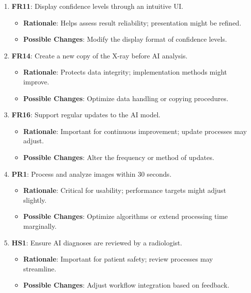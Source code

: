 \documentclass[12pt]{article}
\begin{document}
\begin{enumerate}[resume]
    \item \textbf{FR11}: Display confidence levels through an intuitive UI.
    \begin{itemize}[label=-]
        \item \textbf{Rationale}: Helps assess result reliability; presentation might be refined.
        \item \textbf{Possible Changes}: Modify the display format of confidence levels.
    \end{itemize}

    \item \textbf{FR14}: Create a new copy of the X-ray before AI analysis.
    \begin{itemize}[label=-]
        \item \textbf{Rationale}: Protects data integrity; implementation methods might improve.
        \item \textbf{Possible Changes}: Optimize data handling or copying procedures.
    \end{itemize}

    \item \textbf{FR16}: Support regular updates to the AI model.
    \begin{itemize}[label=-]
        \item \textbf{Rationale}: Important for continuous improvement; update processes may adjust.
        \item \textbf{Possible Changes}: Alter the frequency or method of updates.
    \end{itemize}

    \item \textbf{PR1}: Process and analyze images within 30 seconds.
    \begin{itemize}[label=-]
        \item \textbf{Rationale}: Critical for usability; performance targets might adjust slightly.
        \item \textbf{Possible Changes}: Optimize algorithms or extend processing time marginally.
    \end{itemize}

    \item \textbf{HS1}: Ensure AI diagnoses are reviewed by a radiologist.
    \begin{itemize}[label=-]
        \item \textbf{Rationale}: Important for patient safety; review processes may streamline.
        \item \textbf{Possible Changes}: Adjust workflow integration based on feedback.
    \end{itemize}


\end{enumerate}
\end{document}
